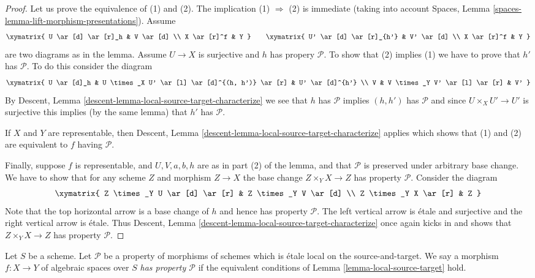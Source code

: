 \begin{proof}
Let us prove the equivalence of (1) and (2).
The implication (1) $\Rightarrow$ (2) is immediate (taking into account
Spaces, Lemma \ref{spaces-lemma-lift-morphism-presentations}).
Assume
$$
\xymatrix{
U \ar[d] \ar[r]_h & V \ar[d] \\
X \ar[r]^f & Y
}
\quad\quad
\xymatrix{
U' \ar[d] \ar[r]_{h'} & V' \ar[d] \\
X \ar[r]^f & Y
}
$$
are two diagrams as in the lemma. Assume $U \to X$ is
surjective and $h$ has propery $\mathcal{P}$. To show that (2)
implies (1) we have to prove that $h'$ has $\mathcal{P}$. To do
this consider the diagram
$$
\xymatrix{
U \ar[d]_h &
U \times_X U' \ar[l] \ar[d]^{(h, h')} \ar[r] &
U' \ar[d]^{h'} \\
V &
V \times_Y V' \ar[l] \ar[r] &
V'
}
$$
By
Descent, Lemma \ref{descent-lemma-local-source-target-characterize}
we see that $h$ has $\mathcal{P}$ implies $(h, h')$ has $\mathcal{P}$
and since $U \times_X U' \to U'$ is surjective this implies (by the
same lemma) that $h'$ has $\mathcal{P}$.

\medskip\noindent
If $X$ and $Y$ are representable, then
Descent, Lemma \ref{descent-lemma-local-source-target-characterize}
applies which shows that (1) and (2) are equivalent to $f$ having
$\mathcal{P}$.

\medskip\noindent
Finally, suppose $f$ is representable, and $U, V, a, b, h$ are
as in part (2) of the lemma, and that $\mathcal{P}$ is preserved under
arbitrary base change. We have to show that for any scheme
$Z$ and morphism $Z \to X$ the base change $Z \times_Y X \to Z$
has property $\mathcal{P}$. Consider the diagram
$$
\xymatrix{
Z \times_Y U \ar[d] \ar[r] &
Z \times_Y V \ar[d] \\
Z \times_Y X \ar[r] &
Z
}
$$
Note that the top horizontal arrow is a base change of $h$ and
hence has property $\mathcal{P}$. The left vertical arrow is \'etale
and surjective and the right vertical arrow is \'etale. Thus
Descent, Lemma \ref{descent-lemma-local-source-target-characterize}
once again kicks in and shows that $Z \times_Y X \to Z$
has property $\mathcal{P}$.
\end{proof}

\begin{definition}
\label{definition-P}
Let $S$ be a scheme.
Let $\mathcal{P}$ be a property of morphisms of schemes
which is \'etale local on the source-and-target.
We say a morphism $f : X \to Y$ of algebraic spaces over $S$
{\it has property $\mathcal{P}$} if the equivalent conditions of
Lemma \ref{lemma-local-source-target}
hold.
\end{definition}

